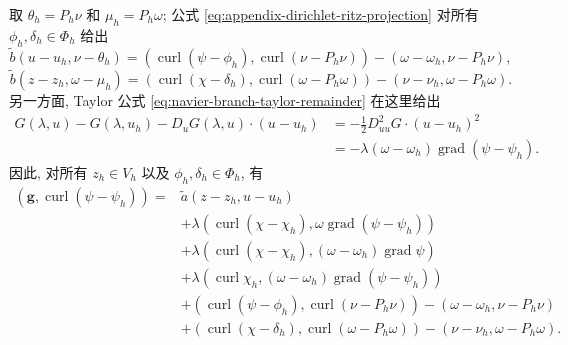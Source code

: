 \begin{Proof}
取 $\theta_h=P_h\nu$ 和 $\mu_h=P_h\omega$;
公式 \eqref{eq:appendix-dirichlet-ritz-projection} 对所有
$\phi_h,\delta_h\in\Phi_h$ 给出
\[
\widetilde b(u-u_h,\nu-\theta_h)
=(\operatorname{curl}(\psi-\phi_h),
\operatorname{curl}(\nu-P_h\nu))
-(\omega-\omega_h,\nu-P_h\nu),
\]
\[
\widetilde b(z-z_h,\omega-\mu_h)
=(\operatorname{curl}(\chi-\delta_h),
\operatorname{curl}(\omega-P_h\omega))
-(\nu-\nu_h,\omega-P_h\omega).
\]
另一方面, Taylor 公式 \eqref{eq:navier-branch-taylor-remainder} 在这里给出
\[
\begin{aligned}
G(\lambda,u)-G(\lambda,u_h)
-D_uG(\lambda,u)\cdot(u-u_h)
&=-\frac12D_{uu}^2G\cdot(u-u_h)^2\\
&=-\lambda(\omega-\omega_h)
\operatorname{grad}(\psi-\psi_h).
\end{aligned}
\]
因此, 对所有 $z_h\in V_h$ 以及 $\phi_h,\delta_h\in\Phi_h$, 有
\begin{equation}\label{eq:navier-centered-stream-expanded-duality}
\begin{aligned}
(\boldsymbol g,\operatorname{curl}(\psi-\psi_h))
={}&\widetilde a(z-z_h,u-u_h)\\
&+\lambda(\operatorname{curl}(\chi-\chi_h),
\omega\operatorname{grad}(\psi-\psi_h))\\
&+\lambda(\operatorname{curl}(\chi-\chi_h),
(\omega-\omega_h)\operatorname{grad}\psi)\\
&+\lambda(\operatorname{curl}\chi_h,
(\omega-\omega_h)\operatorname{grad}(\psi-\psi_h))\\
&+(\operatorname{curl}(\psi-\phi_h),
\operatorname{curl}(\nu-P_h\nu))
-(\omega-\omega_h,\nu-P_h\nu)\\
&+(\operatorname{curl}(\chi-\delta_h),
\operatorname{curl}(\omega-P_h\omega))
-(\nu-\nu_h,\omega-P_h\omega).
\end{aligned}
\end{equation}


\end{Proof}
